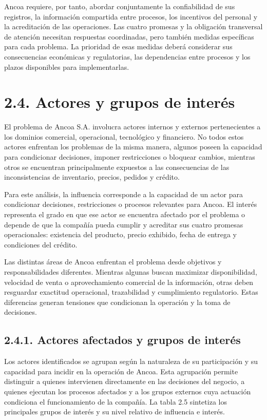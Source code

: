 \documentclass[11pt]{article}
\begin{document}
Ancoa requiere, por tanto, abordar conjuntamente la confiabilidad de sus registros, la información compartida entre procesos, los incentivos del personal y la acreditación de las operaciones. Las cuatro promesas y la obligación transversal de atención necesitan respuestas coordinadas, pero también medidas específicas para cada problema. La prioridad de esas medidas deberá considerar sus consecuencias económicas y regulatorias, las dependencias entre procesos y los plazos disponibles para implementarlas.

\section{2.4. Actores y grupos de interés}\label{actores-y-grupos-de-interuxe9s}

El problema de Ancoa S.A. involucra actores internos y externos pertenecientes a los dominios comercial, operacional, tecnológico y financiero. No todos estos actores enfrentan los problemas de la misma manera, algunos poseen la capacidad para condicionar decisiones, imponer restricciones o bloquear cambios, mientras otros se encuentran principalmente expuestos a las consecuencias de las inconsistencias de inventario, precios, pedidos y crédito.

Para este análisis, la influencia corresponde a la capacidad de un actor para condicionar decisiones, restricciones o procesos relevantes para Ancoa. El interés representa el grado en que ese actor se encuentra afectado por el problema o depende de que la compañía pueda cumplir y acreditar sus cuatro promesas operacionales: existencia del producto, precio exhibido, fecha de entrega y condiciones del crédito.

Las distintas áreas de Ancoa enfrentan el problema desde objetivos y responsabilidades diferentes. Mientras algunas buscan maximizar disponibilidad, velocidad de venta o aprovechamiento comercial de la información, otras deben resguardar exactitud operacional, trazabilidad y cumplimiento regulatorio. Estas diferencias generan tensiones que condicionan la operación y la toma de decisiones.

\subsection{2.4.1. Actores afectados y grupos de interés}\label{actores-afectados-y-grupos-de-interuxe9s}

Los actores identificados se agrupan según la naturaleza de su participación y su capacidad para incidir en la operación de Ancoa. Esta agrupación permite distinguir a quienes intervienen directamente en las decisiones del negocio, a quienes ejecutan los procesos afectados y a los grupos externos cuya actuación condiciona el funcionamiento de la compañía. La tabla 2.5 sintetiza los principales grupos de interés y su nivel relativo de influencia e interés.
\end{document}
